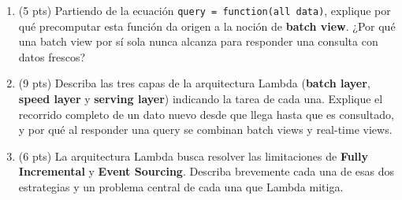 \documentclass[11pt,a4paper]{article}
\begin{document}
\begin{enumerate}
  \item (5 pts) Partiendo de la ecuación \texttt{query = function(all data)}, explique por qué precomputar esta función da origen a la noción de \textbf{batch view}. ¿Por qué una batch view por sí sola nunca alcanza para responder una consulta con datos frescos?

  \vspace{3.5cm}

  \item (9 pts) Describa las tres capas de la arquitectura Lambda (\textbf{batch layer}, \textbf{speed layer} y \textbf{serving layer}) indicando la tarea de cada una. Explique el recorrido completo de un dato nuevo desde que llega hasta que es consultado, y por qué al responder una query se combinan batch views y real-time views.

  \vspace{6.5cm}

  \item (6 pts) La arquitectura Lambda busca resolver las limitaciones de \textbf{Fully Incremental} y \textbf{Event Sourcing}. Describa brevemente cada una de esas dos estrategias y un problema central de cada una que Lambda mitiga.

  \vspace{4.5cm}
\end{enumerate}
\end{document}
